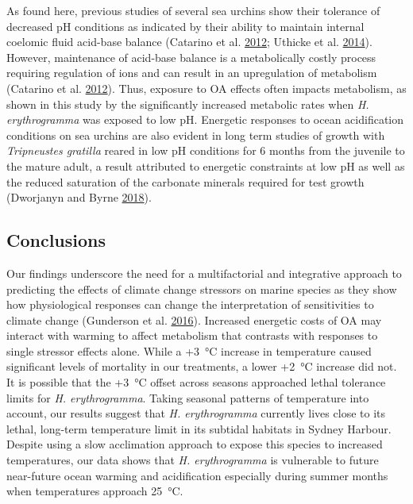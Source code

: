 \documentclass[a4paper,10pt, oneside]{memoir}
\begin{document}
As found here, previous studies of several sea urchins show their tolerance of decreased pH conditions as indicated by their ability to maintain internal coelomic fluid acid-base balance (Catarino et al. \protect\hyperlink{ref-Catarino2012}{2012}; Uthicke et al. \protect\hyperlink{ref-Uthicke2014}{2014}).
However, maintenance of acid-base balance is a metabolically costly process requiring regulation of ions and can result in an upregulation of metabolism (Catarino et al. \protect\hyperlink{ref-Catarino2012}{2012}).
Thus, exposure to OA effects often impacts metabolism, as shown in this study by the significantly increased metabolic rates when \textit{H. erythrogramma} was exposed to low pH.
Energetic responses to ocean acidification conditions on sea urchins are also evident in long term studies of growth with \textit{Tripneustes gratilla} reared in low pH conditions for 6 months from the juvenile to the mature adult, a result attributed to energetic constraints at low pH as well as the reduced saturation of the carbonate minerals required for test growth (Dworjanyn and Byrne \protect\hyperlink{ref-Dworjanyn2018}{2018}).

\hypertarget{conclusions}{%
\subsection{Conclusions}\label{conclusions}}

Our findings underscore the need for a multifactorial and integrative approach to predicting the effects of climate change stressors on marine species as they show how physiological responses can change the interpretation of sensitivities to climate change (Gunderson et al. \protect\hyperlink{ref-Gunderson2016}{2016}).
Increased energetic costs of OA may interact with warming to affect metabolism that contrasts with responses to single stressor effects alone.
While a +\SI{3}{\celsius} increase in temperature caused significant levels of mortality in our treatments, a lower +\SI{2}{\celsius} increase did not.
It is possible that the +\SI{3}{\celsius} offset across seasons approached lethal tolerance limits for \textit{H. erythrogramma}.
Taking seasonal patterns of temperature into account, our results suggest that \textit{H. erythrogramma} currently lives close to its lethal, long-term temperature limit in its subtidal habitats in Sydney Harbour.
Despite using a slow acclimation approach to expose this species to increased temperatures, our data shows that \textit{H. erythrogramma} is vulnerable to future near-future ocean warming and acidification especially during summer months when temperatures approach \SI{25}{\celsius}.
\end{document}
